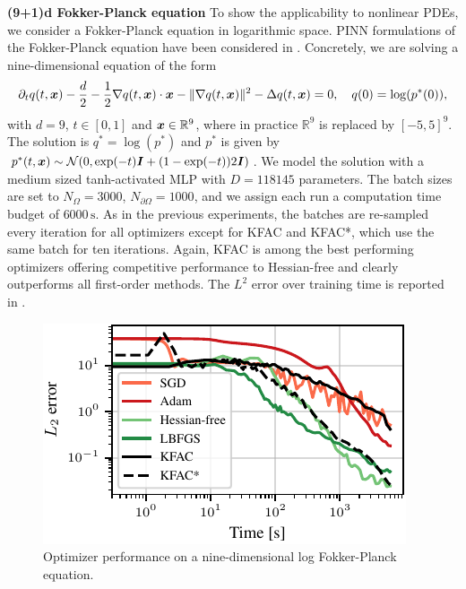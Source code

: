 \textbf{(9+1)d Fokker-Planck equation} To show the applicability to nonlinear PDEs, we consider a Fokker-Planck equation in logarithmic space. PINN formulations of the 
Fokker-Planck equation have been considered in \cite{hu2024score, sun2024dynamical}. Concretely, we are solving a nine-dimensional equation 
of the form
\begin{align}
  \partial_t q(t, {\bm{x}})
  -
  \frac{d}{2}
  -
  \frac12 \nabla q(t,{\bm{x}})\cdot {\bm{x}}
  -
  \lVert \nabla q(t,{\bm{x}}) \rVert^2
  -
  \Delta q(t, {\bm{x}})
  =
  0,
  \quad 
  q(0)
  =
  \log(p^*(0)),
\end{align}
with $d=9$, $t\in[0,1]$ and ${\bm{x}} \in \mathbb R^9$, where in practice $\mathbb R^9$ is replaced by $[-5,5]^9$. 
The solution is $q^* = \log(p^*)$ and $p^*$ is given by 
$p^*(t,{\bm{x}})\sim \mathcal{N}(0, \exp(-t){\bm{I}} + (1-\exp(-t))2{\bm{I}})$. We model the solution with a medium 
sized tanh-activated MLP with $D=\num{118145}$ parameters. The batch sizes are set to 
$N_{\Omega} = \num{3000}$, $N_{\partial\Omega} = \num{1000}$, and we assign each run a computation time
budget of $\num{6000}\,\text{s}$. As in the previous experiments, the batches are re-sampled every iteration 
for all optimizers except for KFAC and KFAC*, which use the same batch for ten iterations. Again, KFAC is among the best performing 
optimizers offering competitive performance to Hessian-free and clearly outperforms all first-order methods. The $L^2$ error
over training time is reported in .

\begin{figure}
  \centering
  \includegraphics{kfac_pinns_exp/exp43_log_fokker_planck9d_isotropic_gaussian_random/l2_error_over_time.pdf}
  \caption{
    Optimizer performance on a nine-dimensional log Fokker-Planck equation.
  }
  \label{fig:10D-logFP}
\end{figure}

